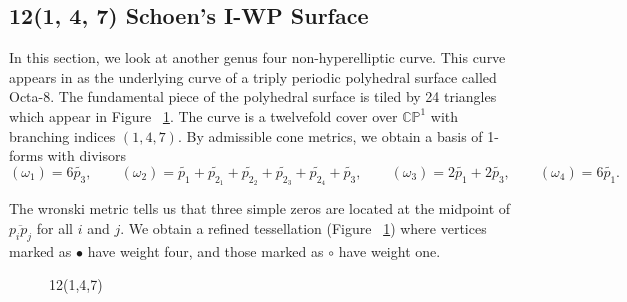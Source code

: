 \documentclass[12pt,reqno]{amsart}
\theoremstyle{definition}
\theoremstyle{remark}
\begin{document}
\subsection*{12(1, 4, 7) Schoen's I-WP Surface}


In this section, we look at another genus four non-hyperelliptic curve. This curve appears in \cite{dthesis} as the underlying curve of a triply periodic polyhedral surface called Octa-8. The fundamental piece of the polyhedral surface is tiled by 24 triangles which appear in Figure~ \cref{fig:147}. The curve is a twelvefold cover over $\mathbb{C}\mathbb{P}^1$ with branching indices $(1, 4, 7).$ By admissible cone metrics, we obtain a basis of 1-forms with divisors $$(\omega_1) = 6 \widetilde{p_3}, \qquad (\omega_2) = \widetilde{p_1} + \widetilde{p_{2_1}} + \widetilde{p_{2_2}} + \widetilde{p_{2_3}} + \widetilde{p_{2_4}} + \widetilde{p_3}, \qquad (\omega_3) = 2 \widetilde{p_1} + 2 \widetilde{p_3}, \qquad (\omega_4) = 6 \widetilde{p_1}.$$

The wronski metric tells us that three simple zeros are located at the midpoint of $\overline{p_i p_j}$ for all $i$ and $j.$ We obtain a refined tessellation (Figure~ \cref{fig:147}) where vertices marked as $\bullet$ have weight four, and those marked as $\circ$ have weight one. 



\begin{figure}[htbp]
    \centering
    \qquad
    \caption{12(1,4,7)}%
    \label{fig:147}%
\end{figure}
\end{document}
